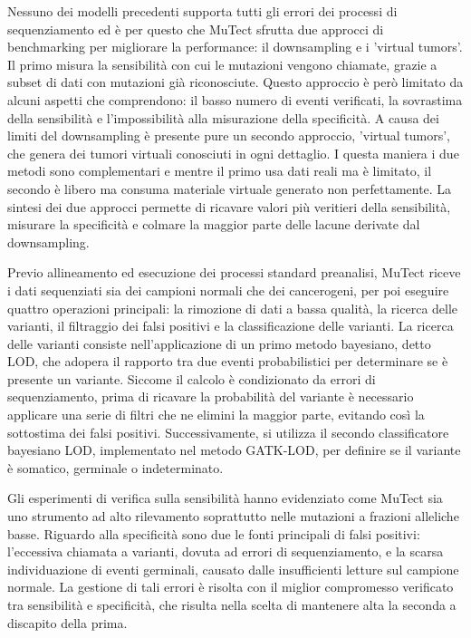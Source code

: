 Nessuno dei modelli precedenti supporta tutti gli errori dei processi di sequenziamento ed è per questo che MuTect sfrutta due approcci di benchmarking per migliorare la performance: il downsampling e  i 'virtual tumors'.
Il primo misura la sensibilità con cui le mutazioni vengono chiamate, grazie a subset di dati con mutazioni già riconosciute.
Questo approccio è però limitato da alcuni aspetti che comprendono: il basso numero di eventi verificati, la sovrastima della sensibilità e l'impossibilità alla misurazione della specificità.
A causa dei limiti del downsampling è presente pure un secondo approccio, 'virtual tumors', che genera dei tumori virtuali conosciuti in ogni dettaglio.
I questa maniera i due metodi sono complementari e mentre il primo usa dati reali ma è limitato, il secondo è libero ma consuma materiale virtuale generato non perfettamente.
La sintesi dei due approcci permette di ricavare valori più veritieri della  sensibilità, misurare la specificità e colmare la maggior parte delle lacune derivate dal downsampling.

Previo allineamento ed esecuzione dei processi standard preanalisi, MuTect riceve i dati sequenziati sia dei campioni normali che dei cancerogeni, per poi eseguire quattro operazioni principali: la rimozione di dati a bassa qualità, la ricerca delle varianti, il filtraggio dei falsi positivi e la classificazione delle varianti.
La ricerca delle varianti consiste nell'applicazione di un primo metodo bayesiano, detto LOD, che adopera il rapporto tra due eventi probabilistici per determinare se è presente un variante.
Siccome il calcolo è condizionato da errori di sequenziamento, prima di ricavare la probabilità del variante è necessario applicare una serie di filtri che ne elimini la maggior parte, evitando così la sottostima dei falsi positivi.
Successivamente, si utilizza il secondo classificatore bayesiano LOD, implementato nel metodo GATK-LOD, per definire se il variante è somatico, germinale o indeterminato.

Gli esperimenti di verifica sulla sensibilità hanno evidenziato come MuTect sia uno strumento ad alto rilevamento soprattutto nelle mutazioni a frazioni alleliche basse.
Riguardo alla specificità sono due le fonti principali di falsi positivi: l'eccessiva chiamata a varianti, dovuta ad errori di sequenziamento, e la scarsa individuazione di eventi germinali, causato dalle insufficienti letture sul campione normale.
La gestione di tali errori è risolta con il miglior compromesso verificato tra sensibilità e specificità, che risulta nella scelta di mantenere alta la seconda a discapito della prima.

